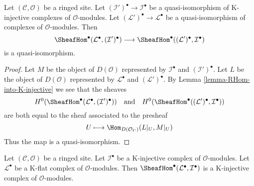 \begin{lemma}
\label{lemma-RHom-well-defined}
Let $(\mathcal{C}, \mathcal{O})$ be a ringed site. Let
$(\mathcal{I}')^\bullet \to \mathcal{I}^\bullet$
be a quasi-isomorphism of K-injective complexes of $\mathcal{O}$-modules.
Let $(\mathcal{L}')^\bullet \to \mathcal{L}^\bullet$
be a quasi-isomorphism of complexes of $\mathcal{O}$-modules.
Then
$$
\SheafHom^\bullet(\mathcal{L}^\bullet, (\mathcal{I}')^\bullet)
\longrightarrow
\SheafHom^\bullet((\mathcal{L}')^\bullet, \mathcal{I}^\bullet)
$$
is a quasi-isomorphism.
\end{lemma}

\begin{proof}
Let $M$ be the object of $D(\mathcal{O})$ represented by
$\mathcal{I}^\bullet$ and $(\mathcal{I}')^\bullet$.
Let $L$ be the object of $D(\mathcal{O})$ represented by
$\mathcal{L}^\bullet$ and $(\mathcal{L}')^\bullet$.
By Lemma \ref{lemma-RHom-into-K-injective}
we see that the sheaves
$$
H^0(\SheafHom^\bullet(\mathcal{L}^\bullet, (\mathcal{I}')^\bullet))
\quad\text{and}\quad
H^0(\SheafHom^\bullet((\mathcal{L}')^\bullet, \mathcal{I}^\bullet))
$$
are both equal to the sheaf associated to the presheaf
$$
U \longmapsto \Hom_{D(\mathcal{O}_U)}(L|_U, M|_U)
$$
Thus the map is a quasi-isomorphism.
\end{proof}

\begin{lemma}
\label{lemma-RHom-from-K-flat-into-K-injective}
Let $(\mathcal{C}, \mathcal{O})$ be a ringed site. Let $\mathcal{I}^\bullet$
be a K-injective complex of $\mathcal{O}$-modules. Let
$\mathcal{L}^\bullet$ be a K-flat complex of $\mathcal{O}$-modules.
Then $\SheafHom^\bullet(\mathcal{L}^\bullet, \mathcal{I}^\bullet)$
is a K-injective complex of $\mathcal{O}$-modules.
\end{lemma}

